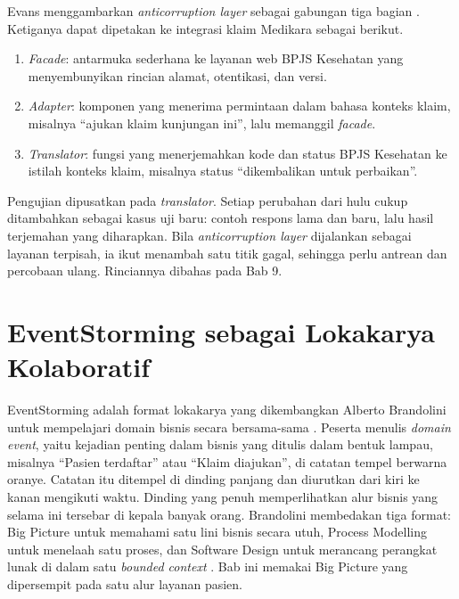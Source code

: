 \begin{pendalaman}[title={Pendalaman Teknis (opsional): Struktur Anticorruption Layer}]
  Evans menggambarkan \textit{anticorruption layer} sebagai gabungan tiga bagian
  \cite{evans2003}. Ketiganya dapat dipetakan ke integrasi klaim Medikara sebagai berikut.
  \begin{enumerate}
    \item \textit{Facade}: antarmuka sederhana ke layanan web BPJS Kesehatan yang menyembunyikan
          rincian alamat, otentikasi, dan versi.
    \item \textit{Adapter}: komponen yang menerima permintaan dalam bahasa konteks klaim, misalnya
          ``ajukan klaim kunjungan ini'', lalu memanggil \textit{facade}.
    \item \textit{Translator}: fungsi yang menerjemahkan kode dan status BPJS Kesehatan ke istilah
          konteks klaim, misalnya status ``dikembalikan untuk perbaikan''.
  \end{enumerate}
  Pengujian dipusatkan pada \textit{translator}. Setiap perubahan dari hulu cukup ditambahkan
  sebagai kasus uji baru: contoh respons lama dan baru, lalu hasil terjemahan yang diharapkan.
  Bila \textit{anticorruption layer} dijalankan sebagai layanan terpisah, ia ikut menambah satu
  titik gagal, sehingga perlu antrean dan percobaan ulang. Rinciannya dibahas pada Bab 9.
\end{pendalaman}

\section{EventStorming sebagai Lokakarya Kolaboratif}
\label{sec:ch06-eventstorming}

EventStorming adalah format lokakarya yang dikembangkan Alberto Brandolini untuk mempelajari domain
bisnis secara bersama-sama \cite{c06-brandolini2021}. Peserta menulis \textit{domain event}, yaitu
kejadian penting dalam bisnis yang ditulis dalam bentuk lampau, misalnya ``Pasien terdaftar'' atau
``Klaim diajukan'', di catatan tempel berwarna oranye. Catatan itu ditempel di dinding panjang dan
diurutkan dari kiri ke kanan mengikuti waktu. Dinding yang penuh memperlihatkan alur bisnis yang
selama ini tersebar di kepala banyak orang. Brandolini membedakan tiga format: Big Picture untuk
memahami satu lini bisnis secara utuh, Process Modelling untuk menelaah satu proses, dan Software
Design untuk merancang perangkat lunak di dalam satu \textit{bounded context}
\cite{c06-brandolini2021,c06-dddcrew-eventstorming}. Bab ini memakai Big Picture yang dipersempit
pada satu alur layanan pasien.

